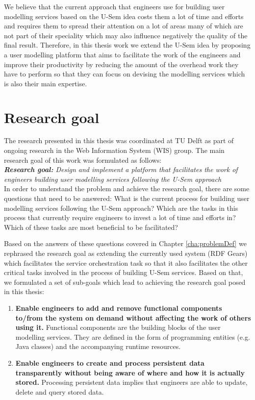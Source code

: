 We believe that the current approach that engineers use for building user modelling services based on the U-Sem idea costs them a lot of time and efforts and requires them to spread their attention on a lot of areas many of which are not part of their speciality which may also influence negatively the quality of the final result. Therefore, in this thesis work we extend the U-Sem idea by proposing a user modelling platform that aims to facilitate the work of the engineers and improve their productivity by reducing the amount of the overhead work they have to perform so that they can focus on devising the modelling services which is also their main expertise.


\section{Research goal}

The research presented in this thesis was coordinated at TU Delft as part of ongoing research in the Web Information System (WIS) group. The main research goal of this work was formulated as follows:\\

\textit{\textbf{Research goal:} Design and implement a platform that facilitates the work of engineers building user modelling services following the U-Sem approach}\\

In order to understand the problem and achieve the research goal, there are some questions that need to be answered: What is the current process for building user modelling services following the U-Sem approach? Which are the tasks in this process that currently require engineers to invest a lot of time and efforts in? Which of these tasks are most beneficial to be facilitated? 

Based on the answers of these questions covered in Chapter \ref{cha:problemDef} we rephrased the research goal as extending the currently used system (RDF Gears) which facilitates the service orchestration task so that it also facilitates the other critical tasks involved in the process of building U-Sem services. Based on that, we formulated a set of sub-goals which lead to achieving the research goal posed in this thesis:

\begin{enumerate}
\item \textbf{Enable engineers to add and remove functional components to/from the system on demand without affecting the work of others using it.}
Functional components are the building blocks of the user modelling services. They are defined in the form of programming entities (e.g. Java classes) and the accompanying runtime resources.

\item \textbf{Enable engineers to create and process persistent data transparently without being aware of where and how it is actually stored.}
Processing persistent data implies that engineers are able to update, delete and query stored data.

\end{enumerate}


